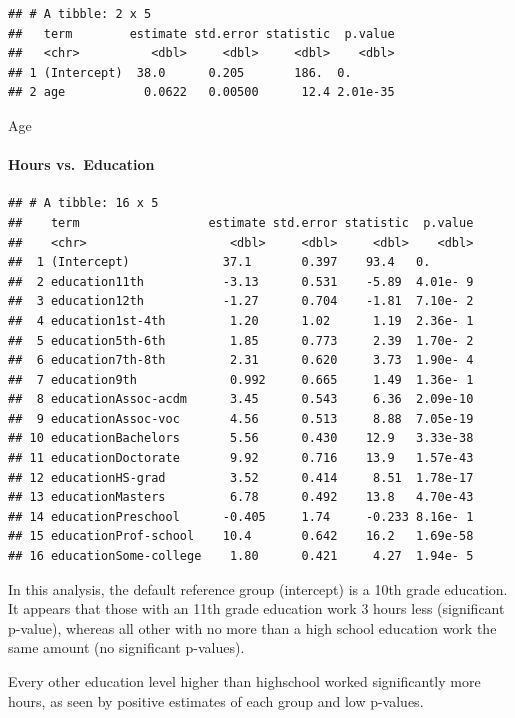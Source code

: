 \documentclass[]{article}
\let\oldparagraph\paragraph
\renewcommand{\paragraph}[1]{\oldparagraph{#1}\mbox{}}
\begin{document}
\begin{verbatim}
## # A tibble: 2 x 5
##   term        estimate std.error statistic  p.value
##   <chr>          <dbl>     <dbl>     <dbl>    <dbl>
## 1 (Intercept)  38.0      0.205       186.  0.      
## 2 age           0.0622   0.00500      12.4 2.01e-35
\end{verbatim}

Age

\hypertarget{hours-vs.education}{%
\paragraph{Hours vs.~Education}\label{hours-vs.education}}

\begin{verbatim}
## # A tibble: 16 x 5
##    term                  estimate std.error statistic  p.value
##    <chr>                    <dbl>     <dbl>     <dbl>    <dbl>
##  1 (Intercept)             37.1       0.397    93.4   0.      
##  2 education11th           -3.13      0.531    -5.89  4.01e- 9
##  3 education12th           -1.27      0.704    -1.81  7.10e- 2
##  4 education1st-4th         1.20      1.02      1.19  2.36e- 1
##  5 education5th-6th         1.85      0.773     2.39  1.70e- 2
##  6 education7th-8th         2.31      0.620     3.73  1.90e- 4
##  7 education9th             0.992     0.665     1.49  1.36e- 1
##  8 educationAssoc-acdm      3.45      0.543     6.36  2.09e-10
##  9 educationAssoc-voc       4.56      0.513     8.88  7.05e-19
## 10 educationBachelors       5.56      0.430    12.9   3.33e-38
## 11 educationDoctorate       9.92      0.716    13.9   1.57e-43
## 12 educationHS-grad         3.52      0.414     8.51  1.78e-17
## 13 educationMasters         6.78      0.492    13.8   4.70e-43
## 14 educationPreschool      -0.405     1.74     -0.233 8.16e- 1
## 15 educationProf-school    10.4       0.642    16.2   1.69e-58
## 16 educationSome-college    1.80      0.421     4.27  1.94e- 5
\end{verbatim}

In this analysis, the default reference group (intercept) is a 10th
grade education. It appears that those with an 11th grade education work
3 hours less (significant p-value), whereas all other with no more than
a high school education work the same amount (no significant p-values).

Every other education level higher than highschool worked significantly
more hours, as seen by positive estimates of each group and low
p-values.
\end{document}
